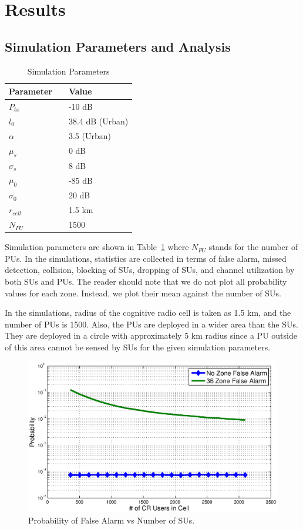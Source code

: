 \documentclass[conference,compsoc]{IEEEtran}
\newcommand{\CR}{cognitive radio }
\begin{document}
\section{\label{sec:results}Results}
\subsection{Simulation Parameters and Analysis}

\begin{table}[!htb]
\renewcommand{\arraystretch}{1.2}
\caption{Simulation Parameters}
\label{tbl:sim_parameters}
\centering
\begin{tabular}{l c l}
  \hline
  Parameter & & Value\\
  \hline
  $P_{tx}$ & & -10 dB \\
  $l_0$    & & 38.4 dB (Urban) \\
  $\alpha$ & & 3.5 (Urban)\\
  $\mu_s$  & & 0 dB\\
  $\sigma_s$ & & 8 dB\\
  $\mu_0$  & & -85 dB \\
  $\sigma_0$ & & 20 dB \\
  $r_{cell}$ & & 1.5 km\\
  $N_{PU}$ & & 1500\\
  \hline
\end{tabular}
\end{table}

Simulation parameters are shown in Table~\ref{tbl:sim_parameters} where $N_{PU}$ stands for the number of PUs. In the simulations, statistics are collected in terms of false alarm, missed detection, collision, blocking of SUs, dropping of SUs, and channel utilization by both SUs and PUs. The reader should note that we do not plot all probability values for each zone. Instead, we plot their mean against the number of SUs.

In the simulations, radius of the \CR cell is taken as 1.5 km, and the number of PUs is 1500. Also, the PUs are deployed in a wider area than the SUs. They are deployed in a circle with approximately 5 km radius since a PU outside of this area cannot be sensed by SUs for the given simulation parameters.

\begin{figure}[b]
\centering
\includegraphics[width=0.99\columnwidth,keepaspectratio] {figs/pf.eps}
\caption{Probability of False Alarm vs Number of SUs.}
\label{fig:probf}
\end{figure}
\end{document}
